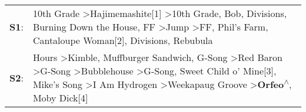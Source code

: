 \begin{supertabular}{p{0.03\textwidth}p{0.92\textwidth}}
 \textbf{S1}:  &                                                                                                                      10th Grade\textsuperscript{} \textgreater \enspace Hajimemashite[1]\textsuperscript{} \textgreater \enspace 10th Grade\textsuperscript{}, \enspace Bob\textsuperscript{}, \enspace Divisions\textsuperscript{}, \enspace Burning Down the House\textsuperscript{}, \enspace FF\textsuperscript{} \textgreater \enspace Jump\textsuperscript{} \textgreater \enspace FF\textsuperscript{}, \enspace Phil's Farm\textsuperscript{}, \enspace Cantaloupe Woman[2]\textsuperscript{}, \enspace Divisions\textsuperscript{}, \enspace Rebubula\textsuperscript{}  \enspace  \\
 \textbf{S2}:  &  Hours\textsuperscript{} \textgreater \enspace Kimble\textsuperscript{}, \enspace Muffburger Sandwich\textsuperscript{}, \enspace G-Song\textsuperscript{} \textgreater \enspace Red Baron\textsuperscript{} \textgreater \enspace G-Song\textsuperscript{} \textgreater \enspace Bubblehouse\textsuperscript{} \textgreater \enspace G-Song\textsuperscript{}, \enspace Sweet Child o' Mine[3]\textsuperscript{}, \enspace Mike's Song\textsuperscript{} \textgreater \enspace I Am Hydrogen\textsuperscript{} \textgreater \enspace Weekapaug Groove\textsuperscript{} \textgreater \enspace \textbf{Orfeo\textsuperscript{$\wedge$}}, \enspace Moby Dick[4]\textsuperscript{}  \enspace  \\
\end{supertabular}
